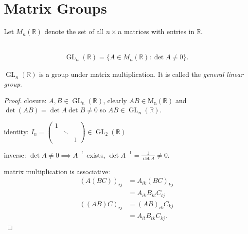 \section{Matrix Groups}

Let $M_n(\mathbb{R})$ denote the set of all $n \times n$ matrices with entries in $\mathbb{R}$. 
\begin{definition} ~\vspace*{-1.5\baselineskip}
    \begin{align*}
        \operatorname{GL}_n(\mathbb{R}) = \{A \in M_n(\mathbb{R}) : \det A \neq 0\}.
    \end{align*} 
\end{definition} 

\begin{proposition} \label{prp:8}
    $\operatorname{GL}_n(\mathbb{R})$ is a group under matrix multiplication.
    It is called the \emph{general linear group}.
\end{proposition} 

\begin{proof}
    closure: $A, B \in \operatorname{GL}_n(\mathbb{R})$, clearly $AB \in \operatorname{M_n}(\mathbb{R})$ and $\det(AB) = \det A \det B \neq 0$ so $AB \in \operatorname{GL}_n(\mathbb{R})$.

    identity: $I_n = \begin{pmatrix}
        1 & & \\
        & \ddots &  \\
        & & 1
      \end{pmatrix} \in \operatorname{GL}_2(\mathbb{R})$

    inverse: $\det A \neq 0 \implies A^{-1}$ exists, $\det A^{-1} = \frac{1}{\det A} \neq 0$.

    matrix multiplication is associative: 
    \begin{align*}
        (A(BC))_{ij} &= A_{ik} (BC)_{kj} \\
        &= A_{ik} B_{kt} C_{tj} \\
        ((AB)C)_{ij} &= (AB)_{ik} C_{kj} \\
        &= A_{it} B_{tk} C_{kj}.
    \end{align*} 
\end{proof} 

